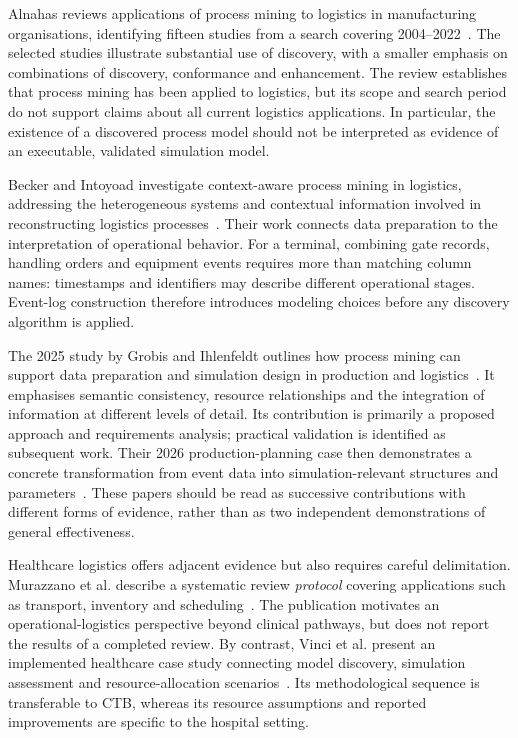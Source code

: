 Alnahas reviews applications of process mining to logistics in manufacturing organisations, identifying fifteen studies from a search covering 2004--2022~\cite{RWAlnahas2023Logistics}. The selected studies illustrate substantial use of discovery, with a smaller emphasis on combinations of discovery, conformance and enhancement. The review establishes that process mining has been applied to logistics, but its scope and search period do not support claims about all current logistics applications. In particular, the existence of a discovered process model should not be interpreted as evidence of an executable, validated simulation model.

Becker and Intoyoad investigate context-aware process mining in logistics, addressing the heterogeneous systems and contextual information involved in reconstructing logistics processes~\cite{RWBecker2017Context}. Their work connects data preparation to the interpretation of operational behavior. For a terminal, combining gate records, handling orders and equipment events requires more than matching column names: timestamps and identifiers may describe different operational stages. Event-log construction therefore introduces modeling choices before any discovery algorithm is applied.

The 2025 study by Grobis and Ihlenfeldt outlines how process mining can support data preparation and simulation design in production and logistics~\cite{Grobis2025ProductionLogistics}. It emphasises semantic consistency, resource relationships and the integration of information at different levels of detail. Its contribution is primarily a proposed approach and requirements analysis; practical validation is identified as subsequent work. Their 2026 production-planning case then demonstrates a concrete transformation from event data into simulation-relevant structures and parameters~\cite{Grobis2026SimulationDevelopment}. These papers should be read as successive contributions with different forms of evidence, rather than as two independent demonstrations of general effectiveness.

Healthcare logistics offers adjacent evidence but also requires careful delimitation. Murazzano et al. describe a systematic review \emph{protocol} covering applications such as transport, inventory and scheduling~\cite{RWMurazzano2026Protocol}. The publication motivates an operational-logistics perspective beyond clinical pathways, but does not report the results of a completed review. By contrast, Vinci et al. present an implemented healthcare case study connecting model discovery, simulation assessment and resource-allocation scenarios~\cite{Hospital2026Vinci}. Its methodological sequence is transferable to CTB, whereas its resource assumptions and reported improvements are specific to the hospital setting.

